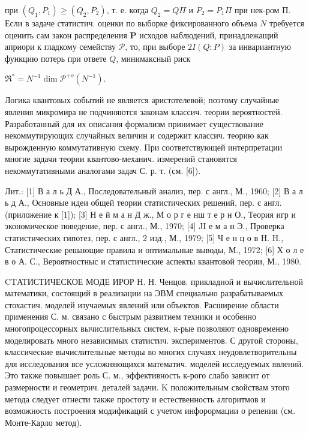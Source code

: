 \documentclass[10pt]{article}
\begin{document}
при $\left(Q_{1}, P_{1}\right) \geqslant\left(Q_{2}, P_{2}\right)$, т. е. когда $Q_{2}=Q \Pi$ и $P_{2}=P_{1} \Pi$ при нек-ром П. Если в задаче статистич. оценки по выборке фиксированного объема $N$ требуется оценить сам закон распределения $\boldsymbol{P}$ исходов наблюдений, принадлежащий априори к гладкому семейству $\mathscr{P}$, то, при выборе $2 I(Q: P)$ за инвариантную функцию потерь при ответе $Q$, минимаксный риск



$\mathfrak{R}^{*}=N^{-1} \operatorname{dim} \mathscr{P}^{+o}\left(N^{-1}\right)$.



Логика квантовых событий не является аристотелевой; поэтому случайные явления микромира не подчиняются законам классич. теории вероятностей. Разработанный для их описания формализм принимает существование некоммутирующих случайных величин и содержит классич. теорию как вырожденную коммутативную схему. При соответствующей интерпретации многие задачи теории квантово-механич. измерений становятся некоммутативными аналогами задач С. р. т. (см. [6]).



Лит.: [1] В а л ь Д А., Последовательный анализ, пер. с англ., М., 1960; [2] В а л ь д А., Основные идеи общей теории статистических решений, пер. с англ. (приложение к [1]); [3] Н е й м а н Д ж., М о р г е нш т е р н О., Теория игр и экономическое поведение, пер. с англ., М., 1970; [4] JI е м а н Э., Проверка статистических гипотез, пер. с англ., 2 изд., М., 1979; [5] Ч е н ц о в H. H., Статистические решающие правила и оптимальные выводы, М., 1972; [6] Х о л е в о А. С., Вероятностныс и статистические аспекты квантовой теории, М., 1980.



CTАТИСТИЧЕСКОЕ МОДЕ ИРОР Н. Н. Ченцов. прикладной и вычислительной математики, состоящий в реализации на ЭВМ специально разрабатываемых стохастич. моделей изучаемых явлений или объектов. Расширение области применения С. м. связано с быстрым развитием техники и особенно многопроцессорных вычислительных систем, к-рые позволяют одновременно моделировать много независимых статистич. экспериментов. С другой стороны, классические вычислительные методы во многих случаях неудовлетворительны для исследования все усложняющихся математич. моделей исследуемых явлений. Это также повышает роль С. м., эффективность к-рого слабо зависит от размерности и геометрич. деталей задачи. $\mathrm{K}$ положительным свойствам этого метода следует отнести также простоту и естественность алгоритмов и возможность построения модификаций с учетом инфорормации о репении (см. Монте-Карло метод).
\end{document}
